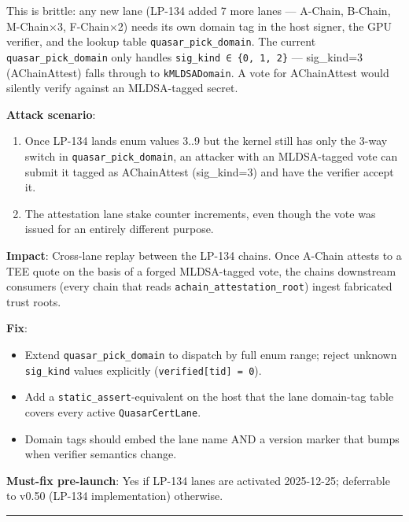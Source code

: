 \documentclass[
]{article}
\providecommand{\tightlist}{%
  \setlength{\itemsep}{0pt}\setlength{\parskip}{0pt}}
\begin{document}
This is brittle: any new lane (LP-134 added 7 more lanes --- A-Chain,
B-Chain, M-Chain×3, F-Chain×2) needs its own domain tag in the host
signer, the GPU verifier, and the lookup table
\texttt{quasar\_pick\_domain}. The current \texttt{quasar\_pick\_domain}
only handles \texttt{sig\_kind\ ∈\ \{0,\ 1,\ 2\}} --- sig\_kind=3
(AChainAttest) falls through to \texttt{kMLDSADomain}. A vote for
AChainAttest would silently verify against an MLDSA-tagged secret.

\textbf{Attack scenario}:

\begin{enumerate}
\def\labelenumi{\arabic{enumi}.}
\tightlist
\item
  Once LP-134 lands enum values 3..9 but the kernel still has only the
  3-way switch in \texttt{quasar\_pick\_domain}, an attacker with an
  MLDSA-tagged vote can submit it tagged as AChainAttest (sig\_kind=3)
  and have the verifier accept it.
\item
  The attestation lane stake counter increments, even though the vote
  was issued for an entirely different purpose.
\end{enumerate}

\textbf{Impact}: Cross-lane replay between the LP-134 chains. Once
A-Chain attests to a TEE quote on the basis of a forged MLDSA-tagged
vote, the chain\textquotesingle s downstream consumers (every chain that
reads \texttt{achain\_attestation\_root}) ingest fabricated trust roots.

\textbf{Fix}:

\begin{itemize}
\tightlist
\item
  Extend \texttt{quasar\_pick\_domain} to dispatch by full enum range;
  reject unknown \texttt{sig\_kind} values explicitly
  (\texttt{verified{[}tid{]}\ =\ 0}).
\item
  Add a \texttt{static\_assert}-equivalent on the host that the lane
  domain-tag table covers every active \texttt{QuasarCertLane}.
\item
  Domain tags should embed the lane name AND a version marker that bumps
  when verifier semantics change.
\end{itemize}

\textbf{Must-fix pre-launch}: Yes if LP-134 lanes are activated
2025-12-25; deferrable to v0.50 (LP-134 implementation) otherwise.

\begin{center}\rule{0.5\linewidth}{0.5pt}\end{center}
\end{document}

